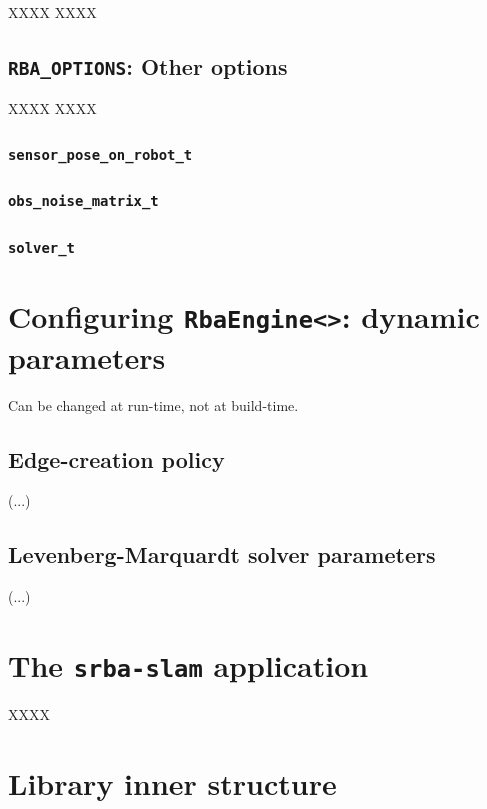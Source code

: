 \documentclass[a4paper,11pt]{article}
\begin{document}
XXXX XXXX 


\subsection{\texttt{RBA\_OPTIONS}: Other options}
\label{sect:rba_options}

XXXX XXXX 


\subsubsection{\texttt{sensor\_pose\_on\_robot\_t}}


\subsubsection{\texttt{obs\_noise\_matrix\_t}}


\subsubsection{\texttt{solver\_t}}


\section{Configuring \texttt{RbaEngine<>}: dynamic parameters}
\label{sect:rba_dyn_parameters}

Can be changed at run-time, not at build-time.

\subsection{Edge-creation policy}
\label{sect:edge.policy}

(...)

\subsection{Levenberg-Marquardt solver parameters}
\label{sect:lm-params}

(...)



\section{The \texttt{srba-slam} application}
\label{sect:srba_slam_app}

XXXX

\section{Library inner structure}
\end{document}
